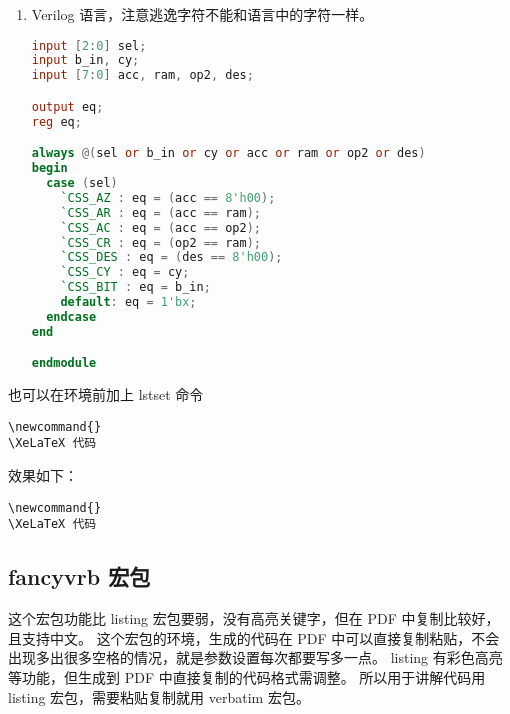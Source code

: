 \begin{enumerate}
  \item Verilog 语言，注意逃逸字符不能和语言中的字符一样。
\begin{lstlisting}[language={Verilog},escapeinside=&&,basicstyle={\ttfamily}]
input [2:0] sel;
input b_in, cy;
input [7:0] acc, ram, op2, des;

output eq;
reg eq;

always @(sel or b_in or cy or acc or ram or op2 or des)
begin
  case (sel)
    `CSS_AZ : eq = (acc == 8'h00);
    `CSS_AR : eq = (acc == ram);
    `CSS_AC : eq = (acc == op2);
    `CSS_CR : eq = (op2 == ram);
    `CSS_DES : eq = (des == 8'h00);
    `CSS_CY : eq = cy;
    `CSS_BIT : eq = b_in;
    default: eq = 1'bx;
  endcase
end

endmodule
\end{lstlisting}

\end{enumerate}

也可以在环境前加上 lstset 命令
\begin{cmd}
\begin{lstlisting}
\newcommand{}
\XeLaTeX 代码
\end{lstlisting}
\end{cmd}

效果如下：

\begin{lstlisting}
\newcommand{}
\XeLaTeX 代码
\end{lstlisting}



\subsection{fancyvrb 宏包}


这个宏包功能比 listing 宏包要弱，没有高亮关键字，但在 PDF 中复制比较好，且支持中文。
这个宏包的环境，生成的代码在 PDF 中可以直接复制粘贴，不会出现多出很多空格的情况，就是参数设置每次都要写多一点。
listing 有彩色高亮等功能，但生成到 PDF 中直接复制的代码格式需调整。
所以用于讲解代码用 listing 宏包，需要粘贴复制就用 verbatim 宏包。

